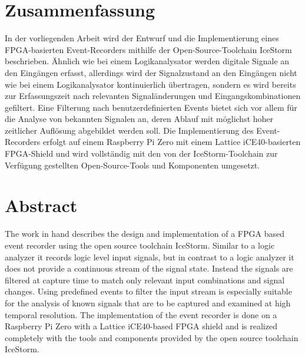 \documentclass[oneside]{wissdoc}
\newcommand{\blankpage}{%
 \clearpage{\pagestyle{empty}\cleardoublepage}
}
\begin{document}



%

\section*{Zusammenfassung}

In der vorliegenden Arbeit wird der Entwurf und die Implementierung eines FPGA-basierten Event-Recorders mithilfe der Open-Source-Toolchain IceStorm beschrieben. Ähnlich wie bei einem Logikanalysator werden digitale Signale an den Eingängen erfasst, allerdings wird der Signalzustand an den Eingängen nicht wie bei einem Logikanalysator kontinuierlich übertragen, sondern es wird bereits zur Erfassungszeit nach relevanten Signaländerungen und Eingangskombinationen gefiltert. Eine Filterung nach benutzerdefinierten Events bietet sich vor allem für die Analyse von bekannten Signalen an, deren Ablauf mit möglichst hoher zeitlicher Auflösung abgebildet werden soll.
Die Implementierung des Event-Recorders erfolgt auf einem Raspberry Pi Zero mit einem Lattice iCE40-basierten FPGA-Shield und wird vollständig mit den von der IceStorm-Toolchain zur Verfügung gestellten Open-Source-Tools und Komponenten umgesetzt.   

\section*{Abstract}

The work in hand describes the design and implementation of a FPGA based event recorder using the open source toolchain IceStorm. 
Similar to a logic analyzer it records logic level input signals, but in contrast to a logic analyzer it does not provide a continuous stream of the signal state. Instead the signals are filtered at capture time to match only relevant input combinations and signal changes. Using predefined events to filter the input stream is especially suitable for the analysis of known signals that are to be captured and examined at high temporal resolution.
The implementation of the event recorder is done on a Raspberry Pi Zero with a Lattice iCE40-based FPGA shield and is realized completely with the tools and components provided by the open source toolchain IceStorm.   


\ifnotdraft{
\tableofcontents
}
\end{document}
